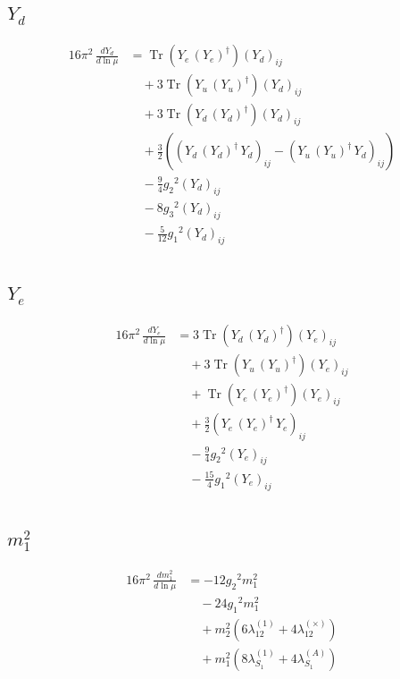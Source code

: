 \documentclass[10pt,a4paper]{article}
\begin{document}
\subsection*{$Y_d$}
\begin{align*}
16\pi^2\,\frac{d Y_d}{d\ln\mu} &=\operatorname{Tr}\!\left({Y_e}\,\left({Y_e}\right)^{\dagger}\right) \left({Y_d}\right)_{ij} \\
&\quad +3 \operatorname{Tr}\!\left({Y_u}\,\left({Y_u}\right)^{\dagger}\right) \left({Y_d}\right)_{ij} \\
&\quad +3 \operatorname{Tr}\!\left({Y_d}\,\left({Y_d}\right)^{\dagger}\right) \left({Y_d}\right)_{ij} \\
&\quad +\frac{3}{2} (\left({Y_d}\,\left({Y_d}\right)^{\dagger}\,{Y_d}\right)_{ij}-\left({Y_u}\,\left({Y_u}\right)^{\dagger}\,{Y_d}\right)_{ij}) \\
&\quad -\frac{9}{4} {g_2}^2 \left({Y_d}\right)_{ij} \\
&\quad -8 {g_3}^2 \left({Y_d}\right)_{ij} \\
&\quad -\frac{5}{12} {g_1}^2 \left({Y_d}\right)_{ij} \\
\end{align*}
\subsection*{$Y_e$}
\begin{align*}
16\pi^2\,\frac{d Y_e}{d\ln\mu} &=3 \operatorname{Tr}\!\left({Y_d}\,\left({Y_d}\right)^{\dagger}\right) \left({Y_e}\right)_{ij} \\
&\quad +3 \operatorname{Tr}\!\left({Y_u}\,\left({Y_u}\right)^{\dagger}\right) \left({Y_e}\right)_{ij} \\
&\quad +\operatorname{Tr}\!\left({Y_e}\,\left({Y_e}\right)^{\dagger}\right) \left({Y_e}\right)_{ij} \\
&\quad +\frac{3}{2} \left({Y_e}\,\left({Y_e}\right)^{\dagger}\,{Y_e}\right)_{ij} \\
&\quad -\frac{9}{4} {g_2}^2 \left({Y_e}\right)_{ij} \\
&\quad -\frac{15}{4} {g_1}^2 \left({Y_e}\right)_{ij} \\
\end{align*}
\subsection*{$m_1^2$}
\begin{align*}
16\pi^2\,\frac{d m_1^2}{d\ln\mu} &=-12 {g_2}^2 {m_1^2} \\
&\quad -24 {g_1}^2 {m_1^2} \\
&\quad +{m_2^2} (6 {\lambda_{12}^{(1)}}+4 {\lambda_{12}^{(\times)}}) \\
&\quad +{m_1^2} (8 {\lambda_{S_1}^{(1)}}+4 {\lambda_{S_1}^{(A)}}) \\
\end{align*}
\end{document}
